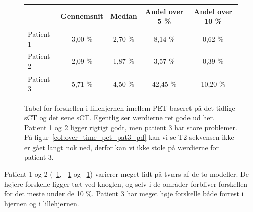 \begin{figure}
    \centering
    \begin{tabular}{| l | c | c | c | c |}
        \hline
         & Gennemsnit & Median & Andel over 5 \% & Andel over 10 \% \\ \hline
        Patient 1 & 3,00 \% & 2,70 \% & 8,14 \% & 0,62 \% \\ \hline
        Patient 2 & 2,09 \% & 1,87 \% & 3,57 \% & 0,39 \% \\ \hline
        Patient 3 & 5,71 \% & 4,50 \% & 42,45 \% & 10,20 \% \\ \hline
    \end{tabular}
    \caption{Tabel for forskellen i lillehjernen imellem PET baseret på det tidlige sCT og det sene sCT. Egentlig ser værdierne ret gode ud her. Patient 1 og 2 ligger rigtigt godt, men patient 3 har store problemer. På figur~\ref{col:over_time_pet_pat3_pd} kan vi se T2-sekvensen ikke er gået langt nok ned, derfor kan vi ikke stole på værdierne for patient 3.}
    \label{tab:over_tid_lillehjerne}
\end{figure}

Patient 1 og 2 (~\ref{tab:over_tid_lillehjerne},
~\ref{tab:over_tid_lillehjerne} og ~\ref{tab:over_tid_lillehjerne})
varierer meget lidt på tværs af de to modeller. De højere forskelle
ligger tæt ved knoglen, og selv i de områder forbliver forskellen for
det meste under de 10 \%. Patient 3 har meget høje forskelle både forrest
i hjernen og i lillehjernen. 
